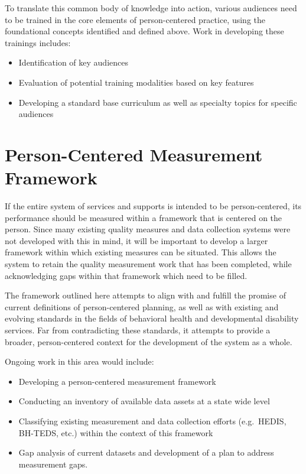 \documentclass[
]{book}
\providecommand{\tightlist}{%
  \setlength{\itemsep}{0pt}\setlength{\parskip}{0pt}}
\begin{document}
To translate this common body of knowledge into action, various audiences need to be trained in the core elements of person-centered practice, using the foundational concepts identified and defined above. Work in developing these trainings includes:

\begin{itemize}
\tightlist
\item
  Identification of key audiences
\item
  Evaluation of potential training modalities based on key features
\item
  Developing a standard base curriculum as well as specialty topics for specific audiences
\end{itemize}

\hypertarget{measure}{%
\chapter{Person-Centered Measurement Framework}\label{measure}}

If the entire system of services and supports is intended to be person-centered, its performance should be measured within a framework that is centered on the person. Since many existing quality measures and data collection systems were not developed with this in mind, it will be important to develop a larger framework within which existing measures can be situated. This allows the system to retain the quality measurement work that has been completed, while acknowledging gaps within that framework which need to be filled.

The framework outlined here attempts to align with and fulfill the promise of current definitions of person-centered planning, as well as with existing and evolving standards in the fields of behavioral health and developmental disability services. Far from contradicting these standards, it attempts to provide a broader, person-centered context for the development of the system as a whole.

Ongoing work in this area would include:

\begin{itemize}
\tightlist
\item
  Developing a person-centered measurement framework
\item
  Conducting an inventory of available data assets at a state wide level
\item
  Classifying existing measurement and data collection efforts (e.g.~HEDIS, BH-TEDS, etc.) within the context of this framework
\item
  Gap analysis of current datasets and development of a plan to address measurement gaps.
\end{itemize}
\end{document}
